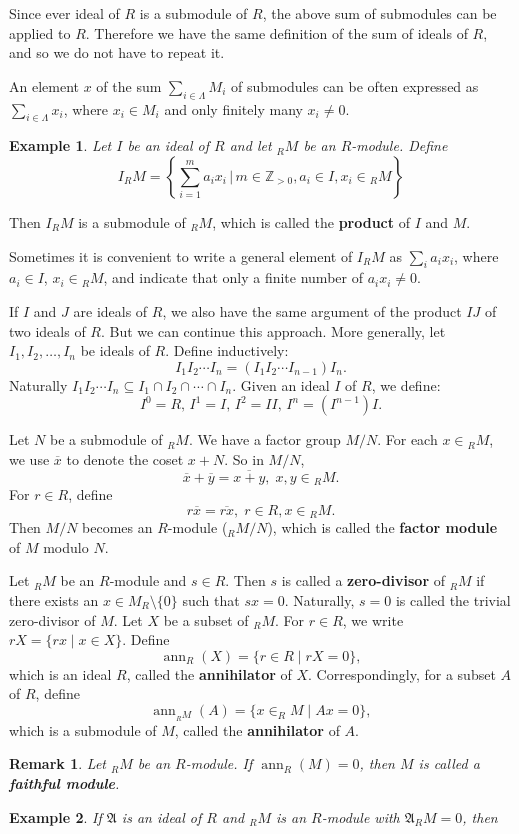 \documentclass[12pt,reqno]{amsart}
\theoremstyle{plain}
\newtheorem{rem}{Remark}
\DeclareMathOperator{\ann}{ann}
\newtheorem{ex}{Example}
\newcommand{\zz}{\mathbb Z}
\newcommand{\idealA}{\mathfrak{A}}
\begin{document}
Since ever ideal of $R$ is a submodule of $R$, the above sum of submodules can be applied to $R$.  Therefore we have the same definition of the sum of ideals of $R$, and so we do not have to repeat it. 

An element $x$ of the sum $\sum_{i \in \Lambda} M_i$ of submodules can be often expressed as $\sum_{i \in \Lambda} x_i$, where $x_i \in M_i$ and only finitely many $x_i \neq 0$.
\begin{ex} Let $I$ be an ideal of $R$ and let $_RM$ be an $R$-module.  Define \[ I {_RM} = \left \{ \sum_{i=1}^m a_i x_i \, \Big | \, m\in \zz_{>0}, a_i \in I, x_i \in {_RM} \right \} \]
\end{ex}
Then $I {_RM}$ is a submodule of $_RM$, which is called the \textbf{product} of $I$ and $M$.

Sometimes it is convenient to write a general element of $I {_RM}$ as $\sum_i a_i x_i$, where $a_i \in I$,  $x_i \in {_RM}$,  and indicate that only a finite number of $a_i x_i \neq 0 $. 

If $I$ and $J$ are ideals of $R$, we also have the same argument of the product $IJ$ of two ideals of $R$. But we can continue this approach.  More generally,  let $I_1, I_2, \ldots, I_n$ be ideals of $R$.  Define inductively: \[I_1 I_2 \cdots I_n = (I_1 I_2 \cdots I_{n-1}) I_n. \] Naturally $I_1 I_2 \cdots I_n \subseteq I_1 \cap I_2 \cap \cdots \cap I_n$.  Given an ideal $I$ of $R$, we define: \[I^0 = R, \, I^1 = I,  \, I^2 = I I , \, I^n = (I^{n-1}) I. \]

Let $N$ be a submodule of $_RM$. We have a factor group $M/N$.  For each $x \in {_RM}$, we use $\overline{x}$ to denote the coset $x + N$.  So in $M/N$,  \[\overline{x}+ \overline{y} = \overline{x+y}, \; x, y \in {_RM}. \]
For $ r \in R$, define \[ r\overline{x} = \overline{rx}, \; r \in R, x \in {_RM} .\]
Then $M/N$ becomes an $R$-module ($_R M/N$), which is called the \textbf{factor module} of $M$ modulo $N$. 

Let $_RM$ be an $R$-module and $s \in R$. Then $s$ is called a \textbf{zero-divisor} of $_RM$ if there exists an $x \in M_R \setminus \{ 0 \}$ such that $sx = 0$. Naturally, $s=0$ is called the trivial zero-divisor of $M$. Let $X$ be a subset of $_RM$. For $r \in R$, we write $rX = \{ rx \mid x \in X \}$.  Define \[ \ann_R (X) = \{ r \in R \mid rX = 0 \} ,\]which is an ideal $R$, called the \textbf{annihilator} of $X$. Correspondingly, for a subset $A$ of $R$, define \[ \ann_{_RM} (A) = \{ x \in _RM \mid Ax = 0 \}, \] which is a submodule of $M$, called the \textbf{annihilator} of $A$. 
\begin{rem} Let $_RM$ be an $R$-module. If $\ann_R (M) = 0$, then $M$ is called a \textbf{faithful module}. 
\end{rem} 
\begin{ex} If $\idealA$ is an ideal of $R$ and $_RM$ is an $R$-module with $\idealA {_RM} = 0$, then 
\end{ex} 
\newpage
\end{document}
